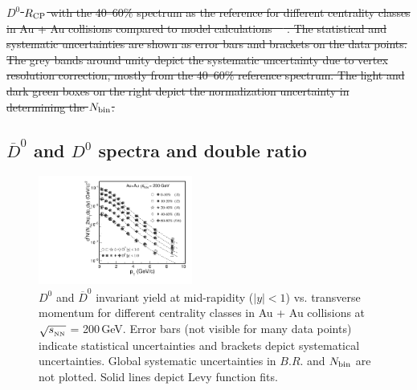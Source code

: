 \documentclass[%
 reprint,	
 amsmath,amssymb,
 aps,
 prc,
]{revtex4-1}
\providecommand{\DIFdeltex}[1]{{\protect\color{red}\sout{#1}}}                      %
\providecommand{\DIFdelend}{} %
\providecommand{\DIFdelFL}[1]{\DIFdel{#1}} %
\providecommand{\DIFdel}[1]{\texorpdfstring{\DIFdeltex{#1}}{}} %
\begin{document}
{%
\DIFdelFL{$D^{0}$ $R_{\rm CP}$ with the 40--60\% spectrum as the reference for different centrality classes in Au + Au collisions compared to model calculations~\mbox{%
\cite{Cao:2016gvr,LBT:private,Xu:2017obm}}%
. The statistical and systematic uncertainties are shown as error bars and brackets on the data points. The grey bands around unity depict the systematic uncertainty due to vertex resolution correction, mostly from the 40--60\% reference spectrum. The light and dark green boxes on the right depict the normalization uncertainty in determining the $N_{\rm bin}$.}}

\DIFdelend %

\subsection{\label{result:D0barD0ratio} $\overline{D}^{0}$ and $D^{0}$ spectra and double ratio}

\begin{figure}
\centering
\includegraphics[width=0.45\textwidth]{fig/D0_spectra_bothposneg.pdf}
\caption{$D^{0}$ and $\overline{D}^{0}$ invariant yield at mid-rapidity ($|y|<1$) vs. transverse momentum for different centrality classes in Au + Au collisions at $\sqrt{s_{_{\rm NN}}}$ = 200\,GeV. Error bars (not visible for many data points) indicate statistical uncertainties and brackets depict systematical uncertainties. Global systematic uncertainties in $B.R.$ and $N_{\rm bin}$ are not plotted. Solid lines depict Levy function fits.}
\label{fig:D0_spectra_bothposneg} 
\end{figure}
\end{document}
